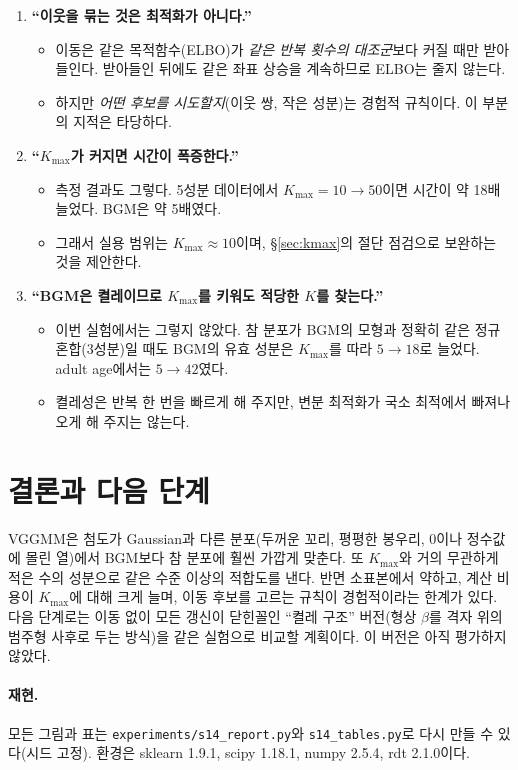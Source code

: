 \documentclass[11pt]{article}
\begin{document}
\begin{enumerate}
  \item \textbf{``이웃을 묶는 것은 최적화가 아니다.''}
    \begin{itemize}
      \item 이동은 같은 목적함수(ELBO)가 \emph{같은 반복 횟수의 대조군}보다 커질 때만 받아들인다. 받아들인 뒤에도 같은 좌표 상승을 계속하므로 ELBO는 줄지 않는다.
      \item 하지만 \emph{어떤 후보를 시도할지}(이웃 쌍, 작은 성분)는 경험적 규칙이다. 이 부분의 지적은 타당하다.
    \end{itemize}
  \item \textbf{``$K_{\max}$가 커지면 시간이 폭증한다.''}
    \begin{itemize}
      \item 측정 결과도 그렇다. 5성분 데이터에서 $K_{\max}=10\to50$이면 시간이 약 18배 늘었다. BGM은 약 5배였다.
      \item 그래서 실용 범위는 $K_{\max}\approx10$이며, \S\ref{sec:kmax}의 절단 점검으로 보완하는 것을 제안한다.
    \end{itemize}
  \item \textbf{``BGM은 켤레이므로 $K_{\max}$를 키워도 적당한 $K$를 찾는다.''}
    \begin{itemize}
      \item 이번 실험에서는 그렇지 않았다. 참 분포가 BGM의 모형과 정확히 같은 정규 혼합(3성분)일 때도 BGM의 유효 성분은 $K_{\max}$를 따라 $5\to18$로 늘었다. adult age에서는 $5\to42$였다.
      \item 켤레성은 반복 한 번을 빠르게 해 주지만, 변분 최적화가 국소 최적에서 빠져나오게 해 주지는 않는다.
    \end{itemize}
\end{enumerate}

\section{결론과 다음 단계}
VGGMM은 첨도가 Gaussian과 다른 분포(두꺼운 꼬리, 평평한 봉우리, 0이나 정수값에 몰린 열)에서 BGM보다 참 분포에 훨씬 가깝게 맞춘다. 또 $K_{\max}$와 거의 무관하게 적은 수의 성분으로 같은 수준 이상의 적합도를 낸다.
반면 소표본에서 약하고, 계산 비용이 $K_{\max}$에 대해 크게 늘며, 이동 후보를 고르는 규칙이 경험적이라는 한계가 있다.
다음 단계로는 이동 없이 모든 갱신이 닫힌꼴인 ``켤레 구조'' 버전(형상 $\beta$를 격자 위의 범주형 사후로 두는 방식)을 같은 실험으로 비교할 계획이다. 이 버전은 아직 평가하지 않았다.

\paragraph{재현.} 모든 그림과 표는 \texttt{experiments/s14\_report.py}와 \texttt{s14\_tables.py}로 다시 만들 수 있다(시드 고정). 환경은 sklearn 1.9.1, scipy 1.18.1, numpy 2.5.4, rdt 2.1.0이다.
\end{document}
